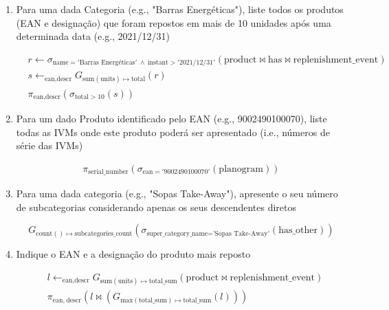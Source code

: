 \documentclass[12pt,a4paper]{article}
\newcommand{\op}{\text}
\begin{document}
  \begin{enumerate}
    \item Para uma dada Categoria (e.g., "Barras Energéticas"), liste todos os produtos (EAN e designação) que foram repostos em mais de 10 unidades após uma determinada data (e.g., 2021/12/31)

    \[
      \begin{aligned}
        &r \leftarrow \sigma_{\op{name}='\text{Barras Energéticas}'~\land~\op{instant} > '\text{2021/12/31}'}(\op{product} \bowtie \op{has} \bowtie \op{replenishment\_event})\\
        &s \leftarrow _{\op{ean}, \op{descr}} G_{\op{sum}(\op{units}) \mapsto \op{total}}(r)\\
        &\pi_{\op{ean}, \op{descr}} \left(\sigma_{\op{total} > 10}\left(s\right)\right)
      \end{aligned}
    \]

    \item Para um dado Produto identificado pelo EAN (e.g., 9002490100070), liste todas as IVMs onde este produto poderá ser apresentado (i.e., números de série das IVMs)

    \[
      \begin{aligned}
        \pi_{\op{serial\_number}}\left(\sigma_{\op{ean}='9002490100070'}\left(\op{planogram}\right)\right)
      \end{aligned}
    \]

    \item Para uma dada categoria (e.g., "Sopas Take-Away"), apresente o seu número de subcategorias considerando apenas os seus descendentes diretos

    \[
      G_{\op{count}()\mapsto \op{subcategories\_count}}\left(\sigma_{\op{super\_category\_name}=\text{'Sopas Take-Away'}}(\op{has\_other})\right)
    \]

    \item Indique o EAN e a designação do produto mais reposto

    \[
      \begin{aligned}
        &l \leftarrow _{\op{ean,descr}} G_{\op{sum}(\op{units})\mapsto \op{total\_sum}}(\op{product} \bowtie \op{replenishment\_event})\\
        &\pi_{\op{ean},~\op{descr}}\left(
          l \bowtie \left( G_{\op{max}(\op{total\_sum})\mapsto \op{total\_sum}}(l)\right)
        \right)
        \end{aligned}
    \]
  \end{enumerate}
  
\end{document}
